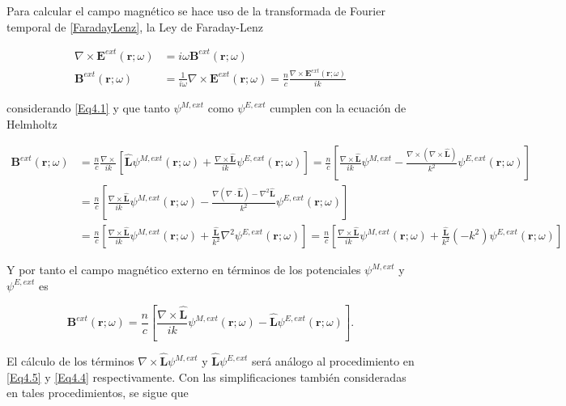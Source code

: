 \documentclass[a4paper,10pt]{article}
\newcommand{\hatbf}[1] {\hat{\mathbf{#1}}}	%
\begin{document}
Para calcular el campo magnético se hace uso de la transformada de Fourier temporal de \eqref{FaradayLenz}, la Ley de Faraday-Lenz

\begin{subequations}
\begin{align}
\nabla\times\textbf{E}^{ext}(\textbf{r};\omega)&=i\omega\textbf{B}^{ext}(\textbf{r};\omega)	\\
\textbf{B}^{ext}(\textbf{r};\omega)&=\frac{1}{i\omega}\nabla\times\textbf{E}^{ext}(\textbf{r};\omega)
=\frac{n}{c}\frac{\nabla\times\textbf{E}^{ext}(\textbf{r};\omega)}{ik}
\end{align}
\label{Eq4.16}
\end{subequations}

considerando \eqref{Eq4.1} y que tanto $\psi^{M,ext}$ como $\psi^{E,ext}$ cumplen con la ecuación de Helmholtz

\begin{subequations}
\begin{align}
\textbf{B}^{ext}(\textbf{r};\omega)
&=\frac{n}{c}\frac{\nabla\times}{ik}\left[\hatbf{L}\psi^{M,ext}(\textbf{r};\omega)+\frac{\nabla\times\hatbf{L}}{ik}\psi^{E,ext}(\textbf{r};\omega)\right]=\frac{n}{c}\left[\frac{\nabla\times\hatbf{L}}{ik}\psi^{M,ext}-\frac{\nabla\times(\nabla\times\hatbf{L})}{k^2}\psi^{E,ext}(\textbf{r};\omega)\right]	\\
&=\frac{n}{c}\left[\frac{\nabla\times\hatbf{L}}{ik}\psi^{M,ext}(\textbf{r};\omega)-\frac{\nabla(\nabla\cdot\hatbf{L})-\nabla^2\hatbf{L}}{k^2}\psi^{E,ext}(\textbf{r};\omega)\right]	\\
&=\frac{n}{c}\left[\frac{\nabla\times\hatbf{L}}{ik}\psi^{M,ext}(\textbf{r};\omega)+\frac{\hatbf{L}}{k^2}\nabla^2\psi^{E,ext}(\textbf{r};\omega)\right]	
=\frac{n}{c}\left[\frac{\nabla\times\hatbf{L}}{ik}\psi^{M,ext}(\textbf{r};\omega)+\frac{\hatbf{L}}{k^2}(-k^2)\psi^{E,ext}(\textbf{r};\omega)\right]	
\end{align}
\end{subequations}

Y por tanto el campo magnético externo en términos de los potenciales $\psi^{M,ext}$ y $\psi^{E,ext}$ es

\begin{equation}
\textbf{B}^{ext}(\textbf{r};\omega)=\frac{n}{c}\left[\frac{\nabla\times\hatbf{L}}{ik}\psi^{M,ext}(\textbf{r};\omega)-\hatbf{L}\psi^{E,ext}(\textbf{r};\omega)\right].
\end{equation}

El cálculo de los términos $\nabla\times\hatbf{L}\psi^{M,ext}$ y $\hatbf{L}\psi^{E,ext}$ será análogo al procedimiento en \eqref{Eq4.5} y \eqref{Eq4.4} respectivamente. Con las simplificaciones también consideradas en tales procedimientos, se sigue que
\end{document}
